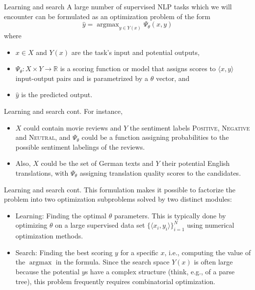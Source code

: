 \documentclass[style=upen, size=14pt]{powerdot}
\DeclareMathOperator*{\argmax}{argmax}
\newcommand{\gold}{\color{arany}}
\begin{document}
\begin{slide}{Learning and search}
  A large number of supervised NLP tasks which we will encounter can be
  formulated as an optimization problem of the form
  $$\hat y = \argmax_{y\in Y(x)}\Psi_\theta(x, y)$$\pause
  where
  \begin{itemize}
  \item $x\in X$ and $Y(x)$ are the task's input and potential outputs,\pause
  \item $\Psi_\theta: X\times Y \rightarrow \mathbb R$ is a scoring function or
    model that assigns scores to $\langle x, y \rangle$ input-output pairs and
    is parametrized by a $\theta$ vector, \pause and
  \item $\hat y$ is the predicted output.
  \end{itemize}
\end{slide}

\begin{slide}[toc=]{Learning and search cont.}
  For instance,
  \begin{itemize}
  \item  $X$ could contain movie reviews and $Y$ the sentiment labels
  \textsc{Positive}, \textsc{Negative} and \textsc{Neutral}, and $\Psi_\theta$
  could be a function assigning probabilities to the possible sentiment labelings
  of the reviews.\pause
\item Also, $X$ could be the set of German texts and $Y$ their potential English
  translations, with $\Psi_\theta$ assigning translation quality scores to the
  candidates.\pause
  \end{itemize}
\end{slide}

\begin{slide}[toc=]{Learning and search cont.}
  This formulation makes it possible to factorize the problem into two
  optimization subproblems solved by two distinct modules:\pause
  \begin{itemize}
  \item {\gold Learning:} Finding the optimal $\theta$ parameters. This is
    typically done by optimizing $\theta$ on a large supervised data set
    $\{\langle x_i, y_i \rangle\}_{i=1}^N$ using numerical optimization methods.\pause
  \item {\gold Search:} Finding the best scoring $y$ for a specific $x$, i.e.,
    computing the value of the $\argmax$ in the formula. Since the search space
    $Y(x)$ is often large because the potential $y$s have a complex structure
    (think, e.g., of a parse tree), this problem frequently requires
    combinatorial optimization.
  \end{itemize}
\end{slide}
\end{document}
